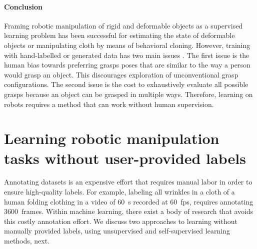 \documentclass[\home/main.tex]{subfiles}
\begin{document}
\paragraph{Conclusion}
Framing robotic manipulation of rigid and deformable objects as a supervised learning problem has been successful for estimating the state of deformable objects or manipulating cloth by means of behavioral cloning. However, training with hand-labelled or generated data has two main issues \autocite{pinto2016supersizing}. The first issue is the human bias towards preferring grasps poses that are similar to the way a person would grasp an object. This discourages exploration of unconventional grasp configurations. The second issue is the cost to exhaustively evaluate all possible grasps because an object can be grasped in multiple ways. Therefore, learning on robots requires a method that can work without human supervision.

\section{Learning robotic manipulation tasks without user-provided labels}
Annotating datasets is an expensive effort that requires manual labor in order to ensure high-quality labels. For example, labeling all wrinkles in a cloth of a human folding clothing in a video of \qty[mode=text]{60}{\second} recorded at \qty{60}{\unit{fps}}, requires annotating \qty{3600}{frames}. Within machine learning, there exist a body of research that avoids this costly annotation effort. We discuss two approaches to learning without manually provided labels, using unsupervised and self-supervised learning methods, next. 
\end{document}
